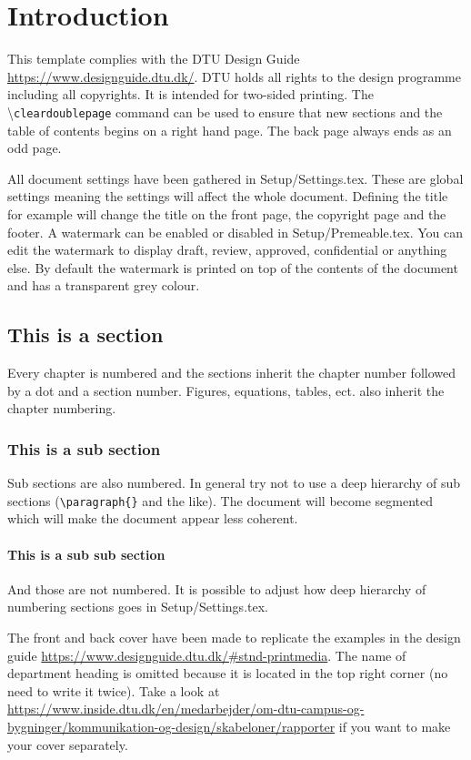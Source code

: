 \chapter{Introduction}
This template complies with the DTU Design Guide \url{https://www.designguide.dtu.dk/}. DTU holds all rights to the design programme including all copyrights. It is intended for two-sided printing. The \textbackslash \texttt{cleardoublepage} command can be used to ensure that new sections and the table of contents begins on a right hand page. The back page always ends as an odd page. 

All document settings have been gathered in Setup/Settings.tex. These are global settings meaning the settings will affect the whole document. Defining the title for example will change the title on the front page, the copyright page and the footer. A watermark can be enabled or disabled in Setup/Premeable.tex. You can edit the watermark to display draft, review, approved, confidential or anything else. By default the watermark is printed on top of the contents of the document and has a transparent grey colour. 

\section{This is a section}
Every chapter is numbered and the sections inherit the chapter number followed by a dot and a section number. Figures, equations, tables, ect. also inherit the chapter numbering. 

\subsection{This is a sub section}
Sub sections are also numbered. In general try not to use a deep hierarchy of sub sections (\texttt{\textbackslash paragraph\{\}} and the like). The document will become segmented which will make the document appear less coherent. 

\subsubsection{This is a sub sub section}
And those are not numbered. It is possible to adjust how deep hierarchy of numbering sections goes in Setup/Settings.tex. 

The front and back cover have been made to replicate the examples in the design guide \url{https://www.designguide.dtu.dk/#stnd-printmedia}. The name of department heading is omitted  because it is located in the top right corner (no need to write it twice). Take a look at \url{https://www.inside.dtu.dk/en/medarbejder/om-dtu-campus-og-bygninger/kommunikation-og-design/skabeloner/rapporter} if you want to make your cover separately. 

